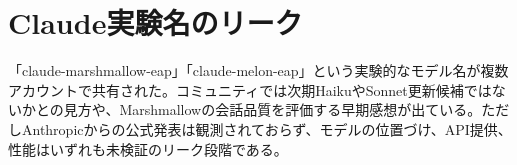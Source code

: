 \section{Claude実験名のリーク}
「claude-marshmallow-eap」「claude-melon-eap」という実験的なモデル名が複数アカウントで共有された。コミュニティでは次期HaikuやSonnet更新候補ではないかとの見方や、Marshmallowの会話品質を評価する早期感想が出ている。ただしAnthropicからの公式発表は観測されておらず、モデルの位置づけ、API提供、性能はいずれも未検証のリーク段階である。
